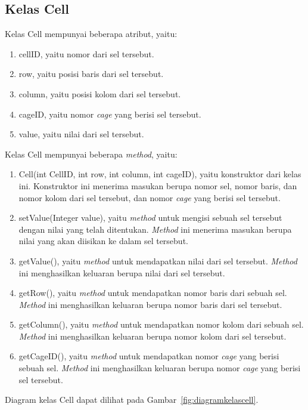 \subsection{Kelas Cell}
\label{sec:kelascell}

Kelas Cell mempunyai beberapa atribut, yaitu:

\begin{enumerate}
\item cellID, yaitu nomor dari sel tersebut.
\item row, yaitu posisi baris dari sel tersebut.
\item column, yaitu posisi kolom dari sel tersebut.
\item cageID, yaitu nomor \textit{cage} yang berisi sel tersebut.
\item value, yaitu nilai dari sel tersebut.
\end{enumerate}

Kelas Cell mempunyai beberapa \textit{method}, yaitu:

\begin{enumerate}
\item Cell(int CellID, int row, int column, int cageID), yaitu konstruktor dari kelas ini. Konstruktor ini menerima masukan berupa nomor sel, nomor baris, dan nomor kolom dari sel tersebut, dan nomor \textit{cage} yang berisi sel tersebut.
\item setValue(Integer value), yaitu \textit{method} untuk mengisi sebuah sel tersebut dengan nilai yang telah ditentukan. \textit{Method} ini menerima masukan berupa nilai yang akan diisikan ke dalam sel tersebut.
\item getValue(), yaitu \textit{method} untuk mendapatkan nilai dari sel tersebut. \textit{Method} ini menghasilkan keluaran berupa nilai dari sel tersebut.
\item getRow(), yaitu \textit{method} untuk mendapatkan nomor baris dari sebuah sel. \textit{Method} ini menghasilkan keluaran berupa nomor baris dari sel tersebut.
\item getColumn(), yaitu \textit{method} untuk mendapatkan nomor kolom dari sebuah sel. \textit{Method} ini menghasilkan keluaran berupa nomor kolom dari sel tersebut.
\item getCageID(), yaitu \textit{method} untuk mendapatkan nomor \textit{cage} yang berisi sebuah sel. \textit{Method} ini menghasilkan keluaran berupa nomor \textit{cage} yang berisi sel tersebut.
\end{enumerate}

Diagram kelas Cell dapat dilihat pada Gambar~\ref{fig:diagramkelascell}.

